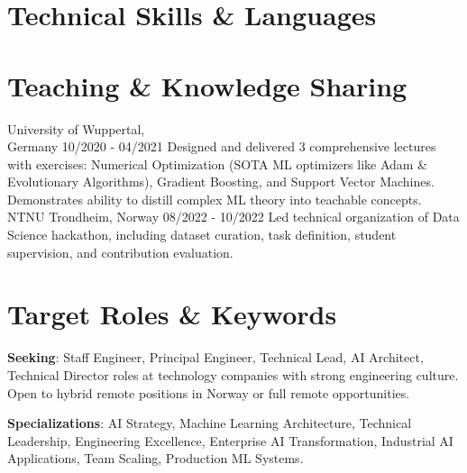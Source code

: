 \documentclass[singlesided,
               paper=a4,
               fontsize=10pt
              ]{my-resume}
\begin{document}
\section[\faFlask]{Technical Skills \& Languages}

\section[\faBook]{Teaching \& Knowledge Sharing}
    {University of Wuppertal,\\ Germany}
    {10/2020 - 04/2021}
    {
        Designed and delivered 3 comprehensive lectures with exercises: Numerical Optimization (SOTA ML optimizers like Adam \& Evolutionary Algorithms), Gradient Boosting, and Support Vector Machines. Demonstrates ability to distill complex ML theory into teachable concepts.
    }
%
	{NTNU Trondheim, Norway}
	{08/2022 - 10/2022}
    {
        Led technical organization of Data Science hackathon, including dataset curation, task definition, student supervision, and contribution evaluation.
    }

\section[\faGears]{Target Roles \& Keywords}
\textbf{Seeking}: Staff Engineer, Principal Engineer, Technical Lead, AI Architect, Technical Director roles at technology companies with strong engineering culture. Open to hybrid remote positions in Norway or full remote opportunities.

\textbf{Specializations}: AI Strategy, Machine Learning Architecture, Technical Leadership, Engineering Excellence, Enterprise AI Transformation, Industrial AI Applications, Team Scaling, Production ML Systems.
\end{document}
